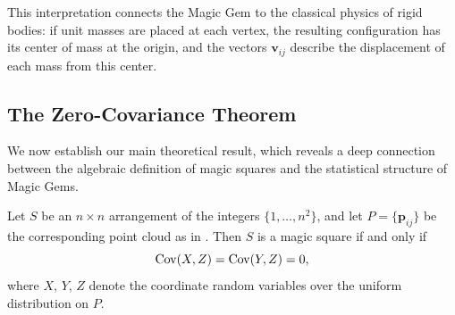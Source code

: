 This interpretation connects the Magic Gem to the classical physics of rigid bodies:
if unit masses are placed at each vertex, the resulting configuration has its center of mass at the origin,
and the vectors $\mathbf{v}_{ij}$ describe the displacement of each mass from this center.

\subsection{The Zero-Covariance Theorem}
\label{sec:zero_cov_theorem}

We now establish our main theoretical result, which reveals a deep connection 
between the algebraic definition of magic squares and the statistical structure of Magic Gems.

\begin{theorem}
\label{thm:zero_covariance}
Let $S$ be an $n \times n$ arrangement of the integers $\{1, \ldots, n^2\}$, 
and let $P = \{\mathbf{p}_{ij}\}$ be the corresponding point cloud as in . 
Then $S$ is a magic square if and only if
\begin{equation}
\mathrm{Cov}(X, Z) = \mathrm{Cov}(Y, Z) = 0,
\end{equation}
where $X$, $Y$, $Z$ denote the coordinate random variables over the uniform distribution on $P$.
\end{theorem}

